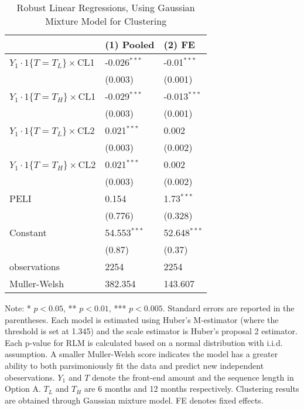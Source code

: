 \documentclass[12pt]{article}
\begin{document}
\begin{table}
    \caption{Robust Linear Regressions, Using Gaussian Mixture Model for Clustering}
    \vspace*{12pt}
    \centering

      \begin{tabular}{lll}
\hline
 & (1) Pooled & (2) FE \\
\hline
$Y_1\cdot1\{T=T_L\}\times$CL1 & -0.026$^{***}$ & -0.01$^{***}$ \\
 & (0.003) & (0.001) \\
$Y_1\cdot1\{T=T_H\}\times$CL1 & -0.029$^{***}$ & -0.013$^{***}$ \\
 & (0.003) & (0.001) \\
$Y_1\cdot1\{T=T_L\}\times$CL2 & 0.021$^{***}$ & 0.002 \\
 & (0.003) & (0.002) \\
$Y_1\cdot1\{T=T_H\}\times$CL2 & 0.021$^{***}$ & 0.002 \\
 & (0.003) & (0.002) \\
PELI & 0.154 & 1.73$^{***}$ \\
 & (0.776) & (0.328) \\
Constant & 54.553$^{***}$ & 52.648$^{***}$ \\
 & (0.87) & (0.37) \\\hline

observations & 2254 & 2254 \\
Muller-Welsh & 382.354 & 143.607 \\
\hline
\end{tabular}

    \vspace*{4pt}
    \centering
    \begin{minipage}{0.85\textwidth}
    {\par\footnotesize Note: * $p<0.05$, ** $p<0.01$, *** $p<0.005$. Standard errors are reported in the parentheses. Each model is estimated using Huber's M-estimator (where the threshold is set at 1.345) and the scale estimator is Huber's proposal 2 estimator. Each p-value for RLM is calculated based on a normal distribution with i.i.d. assumption. A smaller Muller-Welsh score indicates the model has a greater ability to both parsimoniously fit the data and predict new independent obeservations. $Y_1$ and $T$ denote the front-end amount and the sequence length in Option A. $T_L$ and $T_H$ are 6 months and 12 months respectively. Clustering results are obtained through Gaussian mixture model. FE denotes fixed effects.}
    \end{minipage}
    \label{tab:seq_value_rlm}
\end{table}
\end{document}
